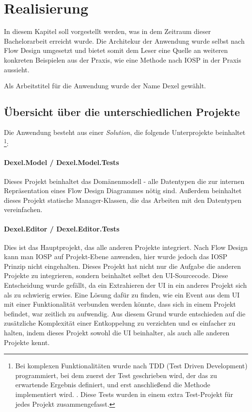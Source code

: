 
\chapter{Realisierung }

In diesem Kapitel soll vorgestellt werden, was in dem Zeitraum dieser
Bachelorarbeit erreicht wurde. Die Architekur der Anwendung wurde selbst nach
Flow Design umgesetzt und bietet somit dem Leser eine Quelle an weiteren
konkreten Beispielen aus der Praxis, wie eine Methode nach IOSP in der Praxis aussieht.

Als Arbeitstitel für die Anwendung wurde der Name Dexel gewählt.

\section{Übersicht über die unterschiedlichen Projekte}

Die Anwendung besteht aus einer \textit{Solution}, die folgende Unterprojekte beinhaltet \footnote{Bei komplexen Funktionalitäten wurde nach TDD (Test Driven Development)
programmiert, bei dem zuerst der Test geschrieben wird, der das zu erwartende
Ergebnis definiert, und erst anschließend die Methode implementiert wird.
. Diese Tests wurden in einem extra Test-Projekt für jedes Projekt zusammengefasst.}:

\subsubsection{Dexel.Model / Dexel.Model.Tests}

Dieses Projekt beinhaltet das Domänenmodell - alle Datentypen die zur internen Repräsentation
eines Flow Design Diagrammes nötig sind. Außerdem beinhaltet dieses Projekt
statische Manager-Klassen, die das Arbeiten mit den Datentypen vereinfachen.

\subsubsection{Dexel.Editor / Dexel.Editor.Tests}

Dies ist das Hauptprojekt, das alle anderen Projekte integriert.
Nach Flow Design kann man IOSP auf Projekt-Ebene anwenden, hier wurde jedoch das IOSP
Prinzip nicht eingehalten. Dieses Projekt hat nicht nur die Aufgabe die
anderen Projekte zu integrieren, sondern beinhaltet selbst den
UI-Sourcecode. Diese Entscheidung wurde gefällt, da ein Extrahieren der UI
in ein anderes Projekt sich als zu schwierig erwies. Eine Lösung dafür zu
finden, wie ein Event aus dem UI mit einer Funktionalität verbunden werden
könnte, dass sich in einem Projekt befindet, war zeitlich zu
aufwendig. Aus diesem Grund wurde entschieden auf die zusätzliche
Komplexität einer Entkoppelung zu verzichten und es einfacher zu halten, indem
dieses Projekt sowohl die UI beinhalter, als auch alle anderen Projekte
kennt.

